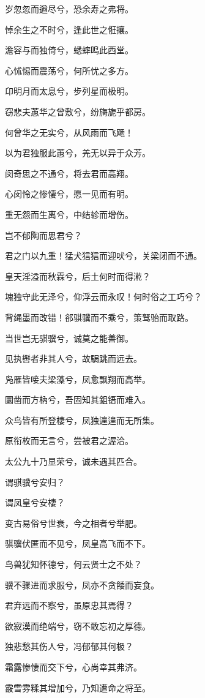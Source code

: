 \documentclass[12pt,a4paper]{ctexbook}
\begin{document}
岁忽忽而遒尽兮，恐余寿之弗将。\par
悼余生之不时兮，逢此世之俇攘。\par
澹容与而独倚兮，蟋蟀鸣此西堂。\par
心怵惕而震荡兮，何所忧之多方。\par
卬明月而太息兮，步列星而极明。\par
窃悲夫蕙华之曾敷兮，纷旖旎乎都房。\par
何曾华之无实兮，从风雨而飞飏！\par
以为君独服此蕙兮，羌无以异于众芳。\par
闵奇思之不通兮，将去君而高翔。\par
心闵怜之惨悽兮，愿一见而有明。\par
重无怨而生离兮，中结轸而增伤。\par
岂不郁陶而思君兮？\par
君之门以九重！猛犬狺狺而迎吠兮，关梁闭而不通。\par
皇天淫溢而秋霖兮，后土何时而得漧？\par
塊独守此无泽兮，仰浮云而永叹！何时俗之工巧兮？\par
背绳墨而改错！郤骐骥而不乘兮，策驽骀而取路。\par
当世岂无骐骥兮，诚莫之能善御。\par
见执辔者非其人兮，故駶跳而远去。\par
凫雁皆唼夫梁藻兮，凤愈飘翔而高举。\par
圜凿而方枘兮，吾固知其鉏铻而难入。\par
众鸟皆有所登棲兮，凤独遑遑而无所集。\par
原衔枚而无言兮，尝被君之渥洽。\par
太公九十乃显荣兮，诚未遇其匹合。\par
谓骐骥兮安归？\par
谓凤皇兮安棲？\par
变古易俗兮世衰，今之相者兮举肥。\par
骐骥伏匿而不见兮，凤皇高飞而不下。\par
鸟兽犹知怀德兮，何云贤士之不处？\par
骥不骤进而求服兮，凤亦不贪餧而妄食。\par
君弃远而不察兮，虽原忠其焉得？\par
欲寂漠而绝端兮，窃不敢忘初之厚德。\par
独悲愁其伤人兮，冯郁郁其何极？\par
霜露惨悽而交下兮，心尚幸其弗济。\par
霰雪雰糅其增加兮，乃知遭命之将至。\par
\end{document}
